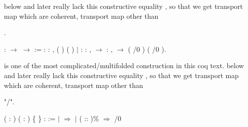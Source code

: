 \coqdocemptyline


  below and later really lack this constructive equality ,
so that we get transport map which are coherent, transport map other than  \begin{coqdoccode}
\coqdocnoindent
{} .\coqdoceol
\end{coqdoccode}
\coqdoceol
\coqdocemptyline
\coqdocnoindent
{}  :  \ensuremath{\rightarrow}  \ensuremath{\rightarrow}  :=\coqdoceol
\coqdocindent{2.00em}
 : \coqdockw{\ensuremath{\forall}}  : ,\coqdoceol
\coqdocindent{12.50em}
 ( ) ( )\coqdoceol
\coqdocindent{1.00em}
\ensuremath{|}  : \coqdockw{\ensuremath{\forall}}   : ,\coqdoceol
\coqdocindent{12.50em}
   \ensuremath{\rightarrow}\coqdoceol
\coqdocindent{12.50em}
\coqdockw{\ensuremath{\forall}}   : ,\coqdoceol
\coqdocindent{12.50em}
   \ensuremath{\rightarrow}\coqdoceol
\coqdocindent{12.50em}
 ( /0 ) ( /0 ).

\coqdocemptyline


  is one of the most complicated/multifolded construction
in this coq text.  below and later really lack this constructive equality ,
so that we get transport map which are coherent, transport map other than  \begin{coqdoccode}
\coqdocemptyline
\coqdocnoindent
{} "/".\coqdoceol
\end{coqdoccode}
\coqdoceol
\coqdocemptyline
\coqdocindent{0.50em}
  ( : ) ( :  ) \{ \} :\coqdoceol
\coqdocindent{1.00em}
 :=\coqdoceol
\coqdocindent{1.00em}
  \coqdoceol
\coqdocindent{1.00em}
\ensuremath{|}  \ensuremath{\Rightarrow} \coqdoceol
\coqdocindent{1.00em}
\ensuremath{|} ( :: )\% \ensuremath{\Rightarrow}    /0  

